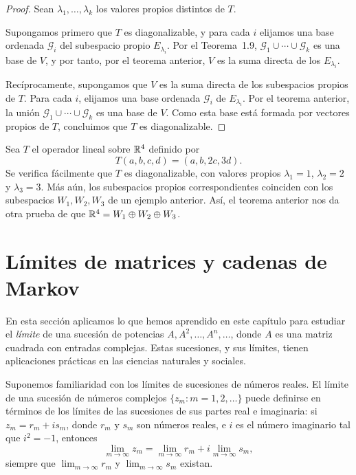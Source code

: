 \documentclass[12pt,a4paper]{book}
\begin{document}
    \begin{proof}
        Sean $\lambda_1,\dots,\lambda_k$ los valores propios distintos de $T$.

        Supongamos primero que $T$ es diagonalizable, y para cada $i$ elijamos una base ordenada $\mathcal{G}_i$ del subespacio propio $E_{\lambda_i}$. Por el Teorema~1.9, $\mathcal{G}_1\cup\cdots\cup\mathcal{G}_k$ es una base de $V$, y por tanto, por el teorema anterior, $V$ es la suma directa de los $E_{\lambda_i}$.

        Recíprocamente, supongamos que $V$ es la suma directa de los subespacios propios de $T$. Para cada $i$, elijamos una base ordenada $\mathcal{G}_i$ de $E_{\lambda_i}$. Por el teorema anterior, la unión $\mathcal{G}_1\cup\cdots\cup\mathcal{G}_k$ es una base de $V$. Como esta base está formada por vectores propios de $T$, concluimos que $T$ es diagonalizable.
    \end{proof}

    \begin{ejemplo}
        Sea $T$ el operador lineal sobre $\mathbb{R}^4$ definido por
        \begin{equation*}
            T(a,b,c,d)=(a,b,2c,3d).
        \end{equation*}
        Se verifica fácilmente que $T$ es diagonalizable, con valores propios $\lambda_1=1$, $\lambda_2=2$ y $\lambda_3=3$. Más aún, los subespacios propios correspondientes coinciden con los subespacios $W_1,W_2,W_3$ de un ejemplo anterior. Así, el teorema anterior nos da otra prueba de que $\mathbb{R}^4=W_1\oplus W_2\oplus W_3$.
    \end{ejemplo}

    \section{Límites de matrices y cadenas de Markov}

    En esta sección aplicamos lo que hemos aprendido en este capítulo para estudiar el \textit{límite} de una sucesión de potencias $A,A^2,\dots,A^n,\dots$, donde $A$ es una matriz cuadrada con entradas complejas. Estas sucesiones, y sus límites, tienen aplicaciones prácticas en las ciencias naturales y sociales.

    Suponemos familiaridad con los límites de sucesiones de números reales. El límite de una sucesión de números complejos $\{z_m:m=1,2,\dots\}$ puede definirse en términos de los límites de las sucesiones de sus partes real e imaginaria: si $z_m=r_m+is_m$, donde $r_m$ y $s_m$ son números reales, e $i$ es el número imaginario tal que $i^2=-1$, entonces
    \begin{equation*}
        \lim_{m\to\infty} z_m=\lim_{m\to\infty}r_m+i\lim_{m\to\infty}s_m,
    \end{equation*}
    siempre que $\lim_{m\to\infty}r_m$ y $\lim_{m\to\infty}s_m$ existan.
\end{document}
